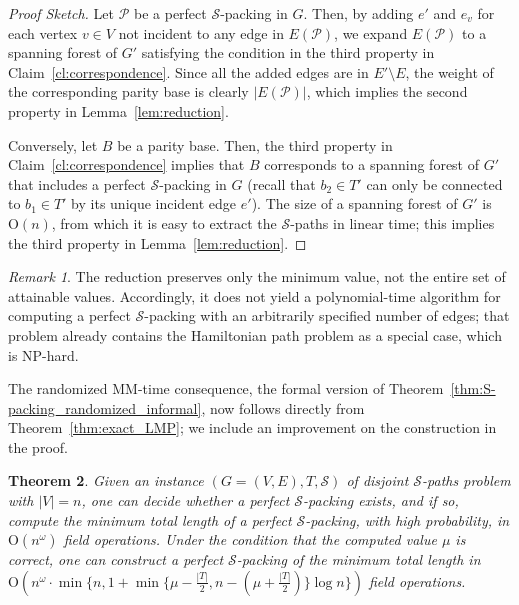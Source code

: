 \documentclass[11pt, a4paper]{article}
\theoremstyle{plain}
\newtheorem{theorem}{Theorem}[section]
\theoremstyle{definition}
\theoremstyle{remark}
\newtheorem{remark}[theorem]{Remark}
\newcommand{\cP}{\mathcal{P}}
\newcommand{\cS}{\mathcal{S}}
\begin{document}
\begin{proof}[Proof Sketch]
Let $\cP$ be a perfect $\cS$-packing in $G$.
Then, by adding $e'$ and $e_v$ for each vertex $v \in V$ not incident to any edge in $E(\cP)$, we expand $E(\cP)$ to a spanning forest of $G'$ satisfying the condition in the third property in Claim~\ref{cl:correspondence}.
Since all the added edges are in $E' \setminus E$, the weight of the corresponding parity base is clearly $|E(\cP)|$, which implies the second property in Lemma~\ref{lem:reduction}.

Conversely, let $B$ be a parity base.
Then, the third property in Claim~\ref{cl:correspondence} implies that $B$ corresponds to a spanning forest of $G'$ that includes a perfect $\cS$-packing in $G$ (recall that $b_2 \in T'$ can only be connected to $b_1 \in T'$ by its unique incident edge $e'$).
The size of a spanning forest of $G'$ is $\mathrm{O}(n)$, from which it is easy to extract the $\cS$-paths in linear time; this implies the third property in Lemma~\ref{lem:reduction}.
\end{proof}

\begin{remark}
The reduction preserves only the minimum value, not the entire set of attainable values.
Accordingly, it does not yield a polynomial-time algorithm for computing a perfect $\cS$-packing with an arbitrarily specified number of edges; that problem already contains the Hamiltonian path problem as a special case, which is NP-hard.
\end{remark}

The randomized MM-time consequence, the formal version of Theorem~\ref{thm:S-packing_randomized_informal}, now follows directly from Theorem~\ref{thm:exact_LMP}; we include an improvement on the construction in the proof.

\begin{theorem}\label{thm:S-packing_randomized}
Given an instance $(G=(V,E), T, \cS)$ of disjoint $\cS$-paths problem with $|V| = n$, one can decide whether a perfect $\cS$-packing exists, and if so, compute the minimum total length of a perfect $\cS$-packing, with high probability, in $\mathrm{O}(n^\omega)$ field operations.
Under the condition that the computed value $\mu$ is correct, one can construct a perfect $\cS$-packing of the minimum total length in $\mathrm{O}(n^{\omega} \cdot \min\{n, 1 + \min\{\mu - \frac{|T|}{2}, n - (\mu + \frac{|T|}{2})\}\log n\})$ field operations.
\end{theorem}
\end{document}
